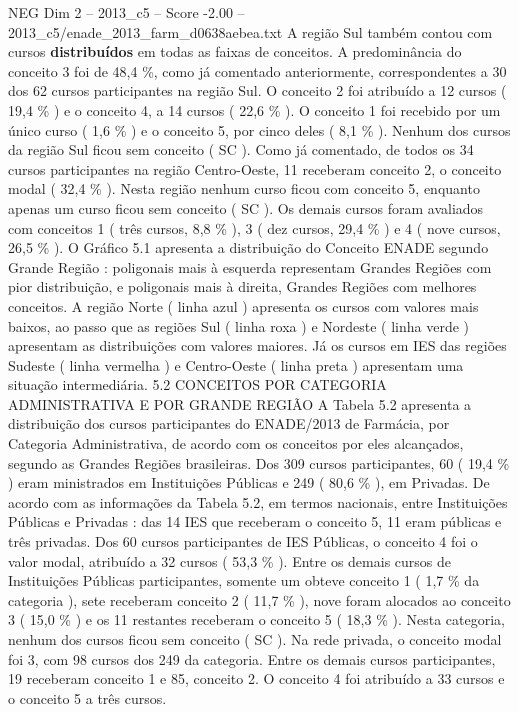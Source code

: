 \begin{textsample}{NEG Dim 2 – 2013\_c5 – Score -2.00 – 2013\_c5/enade\_2013\_farm\_d0638aebea.txt}
A região Sul também contou com cursos \textbf{distribuídos} em todas as faixas de conceitos.
A predominância do conceito 3 foi de 48,4 \%, como já comentado anteriormente, correspondentes a 30 dos 62 cursos participantes na região Sul.
O conceito 2 foi atribuído a 12 cursos ( 19,4 \% ) e o conceito 4, a 14 cursos ( 22,6 \% ).
O conceito 1 foi recebido por um único curso ( 1,6 \% ) e o conceito 5, por cinco deles ( 8,1 \% ).
Nenhum dos cursos da região Sul ficou sem conceito ( SC ).
Como já comentado, de todos os 34 cursos participantes na região Centro-Oeste, 11 receberam conceito 2, o conceito modal ( 32,4 \% ).
Nesta região nenhum curso ficou com conceito 5, enquanto apenas um curso ficou sem conceito ( SC ).
Os demais cursos foram avaliados com conceitos 1 ( três cursos, 8,8 \% ), 3 ( dez cursos, 29,4 \% ) e 4 ( nove cursos, 26,5 \% ).
O Gráfico 5.1 apresenta a distribuição do Conceito ENADE segundo Grande Região : poligonais mais à esquerda representam Grandes Regiões com pior distribuição, e poligonais mais à direita, Grandes Regiões com melhores conceitos.
A região Norte ( linha azul ) apresenta os cursos com valores mais baixos, ao passo que as regiões Sul ( linha roxa ) e Nordeste ( linha verde ) apresentam as distribuições com valores maiores.
Já os cursos em IES das regiões Sudeste ( linha vermelha ) e Centro-Oeste ( linha preta ) apresentam uma situação intermediária. 5.2 CONCEITOS POR CATEGORIA ADMINISTRATIVA E POR GRANDE REGIÃO A Tabela 5.2 apresenta a distribuição dos cursos participantes do ENADE/2013 de Farmácia, por Categoria Administrativa, de acordo com os conceitos por eles alcançados, segundo as Grandes Regiões brasileiras.
Dos 309 cursos participantes, 60 ( 19,4 \% ) eram ministrados em Instituições Públicas e 249 ( 80,6 \% ), em Privadas.
De acordo com as informações da Tabela 5.2, em termos nacionais, entre Instituições Públicas e Privadas : das 14 IES que receberam o conceito 5, 11 eram públicas e três privadas.
Dos 60 cursos participantes de IES Públicas, o conceito 4 foi o valor modal, atribuído a 32 cursos ( 53,3 \% ).
Entre os demais cursos de Instituições Públicas participantes, somente um obteve conceito 1 ( 1,7 \% da categoria ), sete receberam conceito 2 ( 11,7 \% ), nove foram alocados ao conceito 3 ( 15,0 \% ) e os 11 restantes receberam o conceito 5 ( 18,3 \% ).
Nesta categoria, nenhum dos cursos ficou sem conceito ( SC ).
Na rede privada, o conceito modal foi 3, com 98 cursos dos 249 da categoria.
Entre os demais cursos participantes, 19 receberam conceito 1 e 85, conceito 2.
O conceito 4 foi atribuído a 33 cursos e o conceito 5 a três cursos.

\end{textsample}
